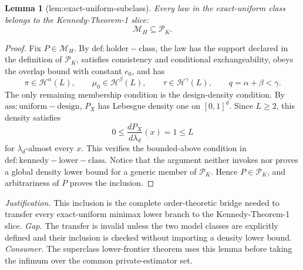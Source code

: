 \documentclass{article}
\newtheorem{lemma}{Lemma}
\begin{document}
\begin{lemma}[lem:exact-uniform-subclass]\label{lem:exact-uniform-subclass}
Every law in the exact-uniform class belongs to the Kennedy-Theorem-1 slice:
\[
\mathcal M_H\subseteq\mathcal P_K.
\]
\end{lemma}
\begin{proof}
Fix \(P\in\mathcal M_H\).  By \(\mathrm{def:holder-class}\), the law has the support declared in the definition of \(\mathcal P_K\), satisfies consistency and conditional exchangeability, obeys the overlap bound with constant \(e_0\), and has
\[
\pi\in\mathcal H^\alpha(L),\qquad
\mu_0\in\mathcal H^\beta(L),\qquad
\tau\in\mathcal H^\gamma(L),
\qquad q=\alpha+\beta<\gamma.
\]
The only remaining membership condition is the design-density condition.  By \(\mathrm{ass:uniform-design}\), \(P_X\) has Lebesgue density one on \([0,1]^d\).  Since \(L\ge2\), this density satisfies
\[
0\le \frac{dP_X}{d\lambda_d}(x)=1\le L
\]
for \(\lambda_d\)-almost every \(x\).  This verifies the bounded-above condition in \(\mathrm{def:kennedy-lower-class}\).  Notice that the argument neither invokes nor proves a global density lower bound for a generic member of \(\mathcal P_K\).  Hence \(P\in\mathcal P_K\), and arbitrariness of \(P\) proves the inclusion.
\end{proof}
\par\smallskip\noindent \textit{Justification.} This inclusion is the complete order-theoretic bridge needed to transfer every exact-uniform minimax lower branch to the Kennedy-Theorem-1 slice. \textit{Gap.} The transfer is invalid unless the two model classes are explicitly defined and their inclusion is checked without importing a density lower bound. \textit{Consumer.} The superclass lower-frontier theorem uses this lemma before taking the infimum over the common private-estimator set.
\end{document}
